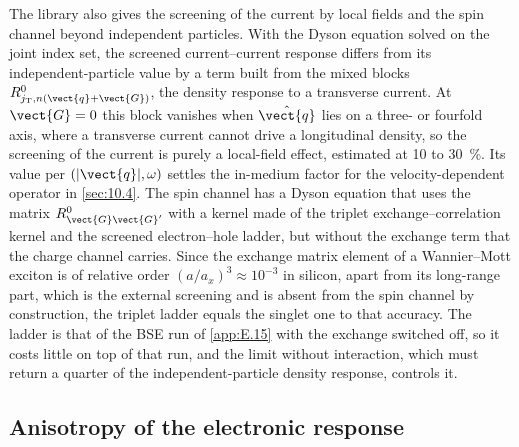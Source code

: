 The library also gives the screening of the current by local fields and the spin channel beyond independent particles. With the Dyson equation solved on the joint index set, the screened current--current response differs from its independent-particle value by a term built from the mixed blocks $R^0_{j_{\mathrm{T}},n(\vect{q}+\vect{G})}$, the density response to a transverse current. At $\vect{G} = 0$ this block vanishes when $\hat{\vect{q}}$ lies on a three- or fourfold axis, where a transverse current cannot drive a longitudinal density, so the screening of the current is purely a local-field effect, estimated at 10 to \SI{30}{\percent}. Its value per $(|\vect{q}|,\omega)$ settles the in-medium factor for the velocity-dependent operator in \cref{sec:10.4}. The spin channel has a Dyson equation that uses the matrix $R^0_{\vect{G}\vect{G}'}$ with a kernel made of the triplet exchange--correlation kernel and the screened electron--hole ladder, but without the exchange term that the charge channel carries. Since the exchange matrix element of a Wannier--Mott exciton is of relative order $(a/a_x)^3 \approx 10^{-3}$ in silicon, apart from its long-range part, which is the external screening and is absent from the spin channel by construction, the triplet ladder equals the singlet one to that accuracy. The ladder is that of the BSE run of \cref{app:E.15} with the exchange switched off, so it costs little on top of that run, and the limit without interaction, which must return a quarter of the independent-particle density response, controls it.

\subsection{Anisotropy of the electronic response}

